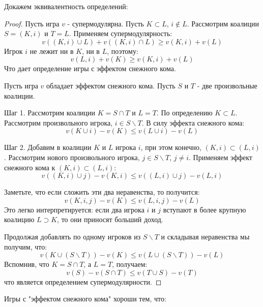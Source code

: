 \documentclass[pdftex,12pt,a4paper]{article}
\numberwithin{equation}{page} %
\theoremstyle{definition} %
\theoremstyle{definition}
\theoremstyle{definition}
\begin{document}
Докажем эквивалентность определений:
\begin{proof}
Пусть игра $v$ - супермодулярна. Пусть $K\subset L$, $i\notin L$. Рассмотрим коалиции $S=(K,i)$ и $T=L$. Применяем супермодулярность:
\begin{equation}
v((K,i)\cup L)+v((K,i)\cap L)\geq v(K,i)+v(L)
\end{equation}
Игрок $i$ не лежит ни в $K$, ни в $L$, поэтому:
\begin{equation}
v(L,i)+v(K)\geq v(K,i)+v(L)
\end{equation}
Что дает определение игры с эффектом снежного кома.

Пусть игра $v$ обладает эффектом снежного кома. Пусть $S$ и $T$ - две произвольные коалиции. 

Шаг 1. Рассмотрим коалиции $K=S\cap T$ и $L=T$. По определению $K\subset L$. Рассмотрим произвольного игрока, $i\in S\backslash T$.
В силу эффекта снежного кома:
\begin{equation}
v(K\cup i)-v(K)\leq v(L\cup i)-v(L)
\end{equation}

Шаг 2. Добавим в коалиции $K$ и $L$ игрока $i$, при этом конечно, $(K,i)\subset (L,i)$. Рассмотрим нового произвольного игрока, $j\in S\backslash T$, $j\neq i$. Применяем эффект снежного кома к $(K,i)\subset (L,i)$:
\begin{equation}
v((K,i)\cup j)-v(K,i)\leq v((L,i)\cup j)-v(L,i)
\end{equation}

Заметьте, что если сложить эти два неравенства, то получится:
\begin{equation}
v(K,i,j)-v(K)\leq v(L,i,j)-v(L)
\end{equation}
Это легко интерпретируется: если два игрока $i$ и $j$ вступают в более крупную коалицию $L\supset K$, то они приносят больший доход.

Продолжая добавлять по одному игроков из $S\backslash T$ и складывая неравенства мы получим, что:
\begin{equation}
v(K\cup (S\backslash T))-v(K)\leq v(L\cup (S\backslash T))-v(L)
\end{equation}
Вспомнив, что $K=S\cap T$, а $L=T$, получаем:
\begin{equation}
v(S)-v(S\cap T)\leq v(T\cup S)-v(T)
\end{equation}
что является определением супермодулярности.
\end{proof}

Игры с "эффектом снежного кома" хороши тем, что:
\end{document}
